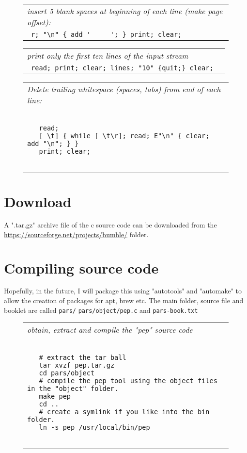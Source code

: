 \documentclass[a4paper,12pt]{article}
\begin{document}
 \begin{figure}
 \begin{tabular}{ l }
 \emph{ insert 5 blank spaces at beginning of each line (make page offset): } \\ 
 \verb| r; "\n" { add '     '; } print; clear; |
 \end{tabular} 
 \end{figure}
 \begin{figure}
 \begin{tabular}{ l }
 \emph{ print only the first ten lines of the input stream } \\ 
 \verb| read; print; clear; lines; "10" {quit;} clear;  |
 \end{tabular} 
 \end{figure}
 \begin{figure}
 \begin{tabular}{ l }
 \emph{ Delete trailing whitespace (spaces, tabs) from end of each line:  } \\ 
 \begin{lstlisting}[breaklines] 

   read;
   [ \t] { while [ \t\r]; read; E"\n" { clear; add "\n"; } }
   print; clear;
 
 \end{lstlisting} 
 \end{tabular} 

 \end{figure}

\section{Download}

  A ".tar.gz" archive file of the c source code can be downloaded from
  the \url{https://sourceforge.net/projects/bumble/} folder.
 
\section{Compiling source code}

  Hopefully, in the future, I will package this using "autotools" and
  "automake" to allow the creation of packages for apt, brew etc. The main
  folder, source file and booklet are called \texttt{pars/} \texttt{pars/object/pep.c} and \texttt{pars-book.txt}
 \begin{figure}
 \begin{tabular}{ l }
 \emph{ obtain, extract and compile the "pep" source code  } \\ 
 \begin{lstlisting}[breaklines] 

   # extract the tar ball
   tar xvzf pep.tar.gz
   cd pars/object
   # compile the pep tool using the object files in the "object" folder.
   make pep
   cd ..
   # create a symlink if you like into the bin folder.
   ln -s pep /usr/local/bin/pep
  
 \end{lstlisting} 
 \end{tabular} 

 \end{figure}
\end{document}
